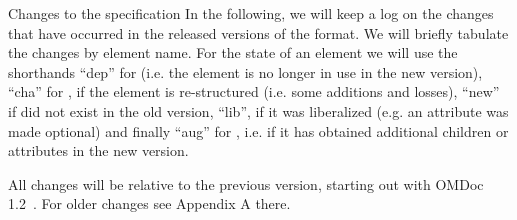 \begin{omgroup}[creators=miko,id=changelog]{Changes to the specification}
In the following, we will keep a log on the changes that have occurred in the released
versions of the {\omdoc} format.  We will briefly tabulate the changes by element
name. For the state of an element we will use the shorthands ``dep'' for
{} (i.e. the element is no longer in use in the new {\omdoc}
version), ``cha'' for {}, if the element is re-structured (i.e.  some
additions and losses), ``new'' if did not exist in the old {\omdoc} version, ``lib'', if
it was liberalized (e.g. an attribute was made optional) and finally ``aug'' for
{}, i.e. if it has obtained additional children or attributes in the
new {\omdoc} version.

All changes will be relative to the previous version, starting out with OMDoc
1.2~\cite{Kohlhase:OMDoc1.2}. For older changes see Appendix A there.

\end{omgroup}

